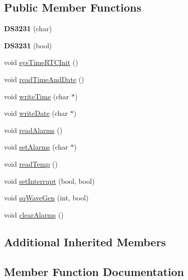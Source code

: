 \subsection*{Public Member Functions}
\begin{DoxyCompactItemize}
\item 
\mbox{\label{classDS3231_a35b7baeaa8c8449c0c08b37a7ef0f21b}} 
{\bfseries D\+S3231} (char)
\item 
\mbox{\label{classDS3231_acdbdfefb5bd96582ef46703a375a96e6}} 
{\bfseries D\+S3231} (bool)
\item 
void \hyperlink{classDS3231_ae7630e2f75c91d116f503292163fc2e9}{sys\+Time\+R\+T\+C\+Init} ()
\item 
void \hyperlink{classDS3231_a847c85a36bf3ab13c942b91733bbbe24}{read\+Time\+And\+Date} ()
\item 
void \hyperlink{classDS3231_a8780408536a9eedfe2f04d4085a103b0}{write\+Time} (char $\ast$)
\item 
void \hyperlink{classDS3231_aa8b6b1279d7f7e04cd4a3797d620cf61}{write\+Date} (char $\ast$)
\item 
void \hyperlink{classDS3231_aee6cdb9ddbce1c2efe76d50cd042fb08}{read\+Alarms} ()
\item 
void \hyperlink{classDS3231_a78d2a067addcb2b5a43962e6442ca060}{set\+Alarms} (char $\ast$)
\item 
void \hyperlink{classDS3231_a9529ddedfae9e6e427197c26ac7c8f0b}{read\+Temp} ()
\item 
void \hyperlink{classDS3231_a43d0b34f3adb3abd8529ccafb23b3c66}{set\+Interrupt} (bool, bool)
\item 
void \hyperlink{classDS3231_a0a56ae678b3708a07e3d8878774b42a8}{sq\+Wave\+Gen} (int, bool)
\item 
void \hyperlink{classDS3231_ad402ba1ca960dd1d1da5fc68d806696e}{clear\+Alarms} ()
\end{DoxyCompactItemize}
\subsection*{Additional Inherited Members}


\subsection{Member Function Documentation}
\mbox{\label{classDS3231_ad402ba1ca960dd1d1da5fc68d806696e}} 
